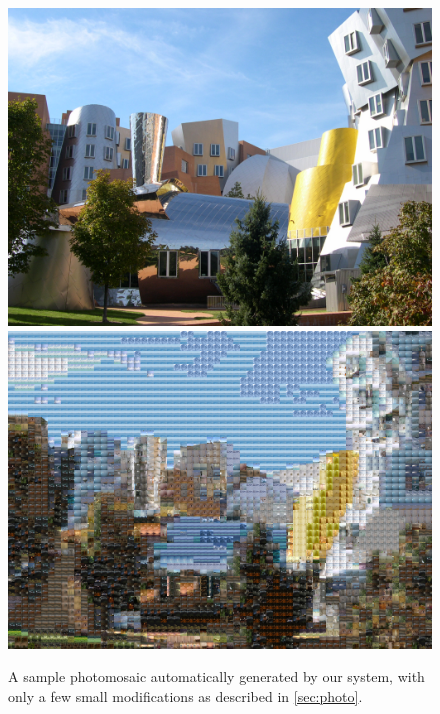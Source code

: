 \documentclass{vldb}
\begin{document}
\clearpage
 \begin{figure}
\centering
\includegraphics[width=0.8\linewidth]{Figures/stata1.jpg}
\includegraphics[width=0.8\linewidth]{Figures/saved.png}
\caption{A sample photomosaic automatically generated by our system, with only a few small modifications as described in \ref{sec:photo}.}
\label{fig:stata}
\end{figure}
\end{document}
